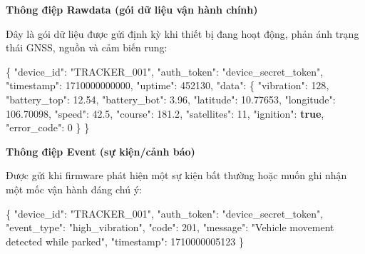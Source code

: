 \documentclass[a4paper]{extarticle}
\newenvironment{Shaded}{}{}
\newcommand{\DataTypeTok}[1]{\textcolor[rgb]{0.56,0.13,0.00}{#1}}
\newcommand{\DecValTok}[1]{\textcolor[rgb]{0.25,0.63,0.44}{#1}}
\newcommand{\FloatTok}[1]{\textcolor[rgb]{0.25,0.63,0.44}{#1}}
\newcommand{\FunctionTok}[1]{\textcolor[rgb]{0.02,0.16,0.49}{#1}}
\newcommand{\KeywordTok}[1]{\textcolor[rgb]{0.00,0.44,0.13}{\textbf{#1}}}
\newcommand{\StringTok}[1]{\textcolor[rgb]{0.25,0.44,0.63}{#1}}
\begin{document}
\textbf{Thông điệp Rawdata (gói dữ liệu vận hành chính)}

Đây là gói dữ liệu được gửi định kỳ khi thiết bị đang hoạt động, phản
ánh trạng thái GNSS, nguồn và cảm biến rung:

\begin{Shaded}
\begin{Highlighting}[]
\FunctionTok{\{}
  \DataTypeTok{"device\_id"}\FunctionTok{:} \StringTok{"TRACKER\_001"}\FunctionTok{,}
  \DataTypeTok{"auth\_token"}\FunctionTok{:} \StringTok{"device\_secret\_token"}\FunctionTok{,}
  \DataTypeTok{"timestamp"}\FunctionTok{:} \DecValTok{1710000000000}\FunctionTok{,}
  \DataTypeTok{"uptime"}\FunctionTok{:} \DecValTok{452130}\FunctionTok{,}
  \DataTypeTok{"data"}\FunctionTok{:} \FunctionTok{\{}
    \DataTypeTok{"vibration"}\FunctionTok{:} \DecValTok{128}\FunctionTok{,}
    \DataTypeTok{"battery\_top"}\FunctionTok{:} \FloatTok{12.54}\FunctionTok{,}
    \DataTypeTok{"battery\_bot"}\FunctionTok{:} \FloatTok{3.96}\FunctionTok{,}
    \DataTypeTok{"latitude"}\FunctionTok{:} \FloatTok{10.77653}\FunctionTok{,}
    \DataTypeTok{"longitude"}\FunctionTok{:} \FloatTok{106.70098}\FunctionTok{,}
    \DataTypeTok{"speed"}\FunctionTok{:} \FloatTok{42.5}\FunctionTok{,}
    \DataTypeTok{"course"}\FunctionTok{:} \FloatTok{181.2}\FunctionTok{,}
    \DataTypeTok{"satellites"}\FunctionTok{:} \DecValTok{11}\FunctionTok{,}
    \DataTypeTok{"ignition"}\FunctionTok{:} \KeywordTok{true}\FunctionTok{,}
    \DataTypeTok{"error\_code"}\FunctionTok{:} \DecValTok{0}
  \FunctionTok{\}}
\FunctionTok{\}}
\end{Highlighting}
\end{Shaded}

\textbf{Thông điệp Event (sự kiện/cảnh báo)}

Được gửi khi firmware phát hiện một sự kiện bất thường hoặc muốn ghi
nhận một mốc vận hành đáng chú ý:

\begin{Shaded}
\begin{Highlighting}[]
\FunctionTok{\{}
  \DataTypeTok{"device\_id"}\FunctionTok{:} \StringTok{"TRACKER\_001"}\FunctionTok{,}
  \DataTypeTok{"auth\_token"}\FunctionTok{:} \StringTok{"device\_secret\_token"}\FunctionTok{,}
  \DataTypeTok{"event\_type"}\FunctionTok{:} \StringTok{"high\_vibration"}\FunctionTok{,}
  \DataTypeTok{"code"}\FunctionTok{:} \DecValTok{201}\FunctionTok{,}
  \DataTypeTok{"message"}\FunctionTok{:} \StringTok{"Vehicle movement detected while parked"}\FunctionTok{,}
  \DataTypeTok{"timestamp"}\FunctionTok{:} \DecValTok{1710000005123}
\FunctionTok{\}}
\end{Highlighting}
\end{Shaded}
\end{document}
